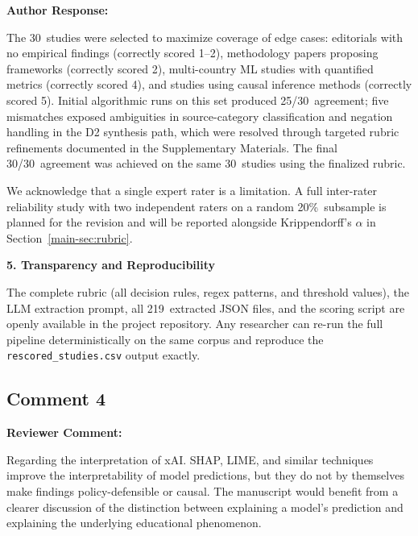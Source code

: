 \documentclass[12pt, a4paper]{article}
\newcommand{\R}[1]{Section~\ref{main-#1}}
\newenvironment{reviewercomment}{%
  \begin{mdframed}[linecolor=reviewercolor, linewidth=1.5pt,
    backgroundcolor=reviewercolor!6, innertopmargin=8pt, innerbottommargin=8pt]
  \color{reviewercolor}\textbf{Reviewer Comment:}\normalcolor\par\smallskip
}{%
  \end{mdframed}\medskip
}
\newenvironment{authorresponse}{%
  \begin{mdframed}[linecolor=authorcolor, linewidth=1pt,
    backgroundcolor=authorcolor!5, innertopmargin=8pt, innerbottommargin=8pt]
  \color{authorcolor}\textbf{Author Response:}\normalcolor\par\smallskip
}{%
  \end{mdframed}\bigskip
}
\begin{document}
\begin{authorresponse}
\smallskip
The 30~studies were selected to maximize coverage of edge cases: editorials
with no empirical findings (correctly scored 1--2), methodology papers
proposing frameworks (correctly scored 2), multi-country ML studies with
quantified metrics (correctly scored 4), and studies using causal inference
methods (correctly scored 5). Initial algorithmic runs on this set produced
25/30~agreement; five mismatches exposed ambiguities in source-category
classification and negation handling in the D2 synthesis path, which were
resolved through targeted rubric refinements documented in the Supplementary
Materials. The final 30/30~agreement was achieved on the same 30~studies
using the finalized rubric.

We acknowledge that a single expert rater is a limitation. A full
inter-rater reliability study with two independent raters on a random
20\%~subsample is planned for the revision and will be reported alongside
Krippendorff's $\alpha$ in \R{sec:rubric}.

\medskip
\noindent\textbf{5. Transparency and Reproducibility}

The complete rubric (all decision rules, regex patterns, and threshold
values), the LLM extraction prompt, all 219~extracted JSON files, and the
scoring script are openly available in the project repository. Any
researcher can re-run the full pipeline deterministically on the same
corpus and reproduce the \texttt{rescored\_studies.csv} output exactly.
\end{authorresponse}

\subsection*{Comment 4}

\begin{reviewercomment}
Regarding the interpretation of xAI. SHAP, LIME, and similar techniques
improve the interpretability of model predictions, but they do not by
themselves make findings policy-defensible or causal. The manuscript would
benefit from a clearer discussion of the distinction between explaining a
model's prediction and explaining the underlying educational phenomenon.
\end{reviewercomment}
\end{document}
